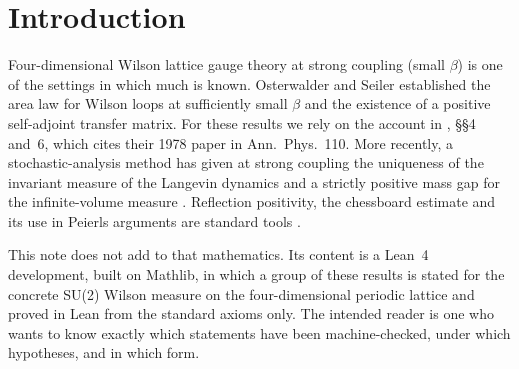 \documentclass[11pt,a4paper]{article}
\theoremstyle{definition}
\theoremstyle{remark}
\newcommand{\Z}{\mathbb{Z}}
\begin{document}
\begin{abstract}
The Peierls-type bound is uniform over the tori $(\Z/2m)^4$, $m\ge2$, for $\beta\ge 81$ (a weak-coupling statement).
The mathematics is classical: strong-coupling expansions, Dobrushin's comparison method, Osterwalder--Seiler reflection positivity and reconstruction, and Peierls arguments with chessboard estimates.
Our coupling windows are narrower than those in the literature, and the contribution of this note is the machine check.
Nothing is said about the continuum limit, about the existence of a continuum theory, or about a continuum mass gap.
Every theorem of the correspondence table depends only on the axioms \texttt{propext}, \texttt{Classical.choice} and \texttt{Quot.sound}.
\end{abstract}

\section{Introduction}\label{sec:intro}

Four-dimensional Wilson lattice gauge theory at strong coupling (small $\beta$) is one of the settings in which much is known.
Osterwalder and Seiler established the area law for Wilson loops at sufficiently small $\beta$ and the existence of a positive self-adjoint transfer matrix.
For these results we rely on the account in \cite{Ch18}, \S\S4 and~6, which cites their 1978 paper in Ann.\ Phys.\ 110.
More recently, a stochastic-analysis method has given at strong coupling the uniqueness of the invariant measure of the Langevin dynamics and a strictly positive mass gap for the infinite-volume measure \cite{SZZ}.
Reflection positivity, the chessboard estimate and its use in Peierls arguments are standard tools \cite{FILS,Bis}.

This note does not add to that mathematics. Its content is a Lean~4 development, built on Mathlib, in which a group of these results is stated for the concrete SU(2) Wilson measure on the four-dimensional periodic lattice and proved in Lean from the standard axioms only. The intended reader is one who wants to know exactly which statements have been machine-checked, under which hypotheses, and in which form.
\end{document}
